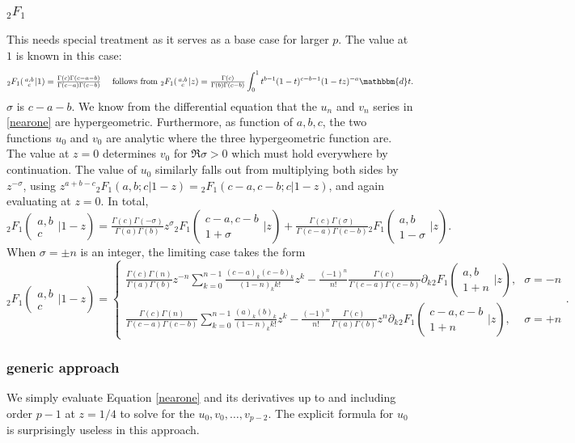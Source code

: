 \documentclass[12pt]{article}
\newcommand{\dd}[0] {\mathbbm{d}}
\numberwithin{equation}{section}
\newcommand{\Head}[3] {{}_{#1}{#2}_{#3}}
\newcommand{\ArgS}[3] {( \begin{smallmatrix} #1 \\ #2 \end{smallmatrix} | {#3})}
\begin{document}
\subsubsection{$\Head{2}{F}{1}$}
This needs special treatment as it serves as a base case for larger $p$. The value at $1$ is known in this case:
\begin{equation*}
\Head{2}{F}{1} \ArgS{a,b}{c}{1} = \tfrac{\Gamma(c)\Gamma(c-a-b)}{\Gamma(c-a)\Gamma(c-b)} \quad \text{ follows from } \Head{2}{F}{1} \ArgS{a,b}{c}{z} = \tfrac{\Gamma(c)}{\Gamma(b)\Gamma(c-b)} \int_0^1 t^{b-1} (1-t)^{c-b-1} (1-t z)^{-a} \dd t\text{.}
\end{equation*}
$\sigma$ is $c-a-b$. We know from the differential equation that the $u_n$ and $v_n$ series in \eqref{nearone} are hypergeometric. Furthermore, as function of $a,b,c$, the two functions $u_0$ and $v_0$ are analytic where the three hypergeometric function are. The value at $z=0$ determines $v_0$ for $\Re \sigma > 0$ which must hold everywhere by continuation. The value of $u_0$ similarly falls out from multiplying both sides by $z^{-\sigma}$, using $z^{a+b-c} \Head{2}{F}{1}(a,b;c|1-z) = \Head{2}{F}{1}(c-a,c-b;c|1-z)$, and again evaluating at $z=0$. In total,
\begin{equation*}
\Head{2}{F}{1} \ArgS{a,b}{c}{1-z} = \tfrac{\Gamma(c)\Gamma(-\sigma)}{\Gamma(a)\Gamma(b)} z^{\sigma} \Head{2}{F}{1} \ArgS{c-a,c-b}{1+\sigma}{z} + \tfrac{\Gamma(c)\Gamma(\sigma)}{\Gamma(c-a)\Gamma(c-b)} \Head{2}{F}{1} \ArgS{a,b}{1-\sigma}{z}\text{.}
\end{equation*}
When $\sigma=\pm n$ is an integer, the limiting case takes the form
\begin{equation*}
\Head{2}{F}{1} \ArgS{a,b}{c}{1-z} = \begin{cases} \tfrac{\Gamma(c)\Gamma(n)}{\Gamma(a)\Gamma(b)} z^{-n} \sum_{k=0}^{n-1} \tfrac{(c-a)_k(c-b)_k}{(1-n)_k k!} z^k - \tfrac{(-1)^{n}}{n!} \tfrac{\Gamma(c)}{\Gamma(c-a)\Gamma(c-b)} \partial_k \Head{2}{F}{1} \ArgS{a,b}{1+n}{z}\text{,} &\sigma = -n\\
\tfrac{\Gamma(c)\Gamma(n)}{\Gamma(c-a)\Gamma(c-b)} \sum_{k=0}^{n-1} \tfrac{(a)_k(b)_k}{(1-n)_k k!} z^k - \tfrac{(-1)^{n}}{n!} \tfrac{\Gamma(c)}{\Gamma(a)\Gamma(b)} z^n \partial_k \Head{2}{F}{1} \ArgS{c-a,c-b}{1+n}{z}\text{,} &\sigma = +n
\end{cases}
\text{.}
\end{equation*}

\subsubsection{generic approach}
We simply evaluate Equation \eqref{nearone} and its derivatives up to and including order $p-1$ at $z=1/4$ to solve for the $u_0,v_0,\dots,v_{p-2}$. The explicit formula for $u_0$ is surprisingly useless in this approach.
\end{document}
